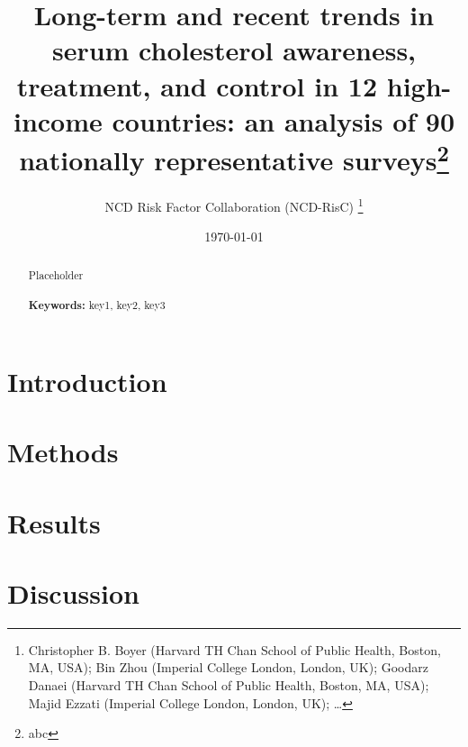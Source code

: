 \documentclass[12pt]{article}
\begin{document}
\begin{titlepage}
\title{Long-term and recent trends in serum cholesterol awareness, treatment, and control in 12 high-income countries: an analysis of 90 nationally representative surveys\thanks{abc}}
\author{NCD Risk Factor Collaboration (NCD-RisC) 
    \thanks{Christopher B. Boyer (Harvard TH Chan School of Public Health, Boston, MA, USA); Bin Zhou (Imperial College London, London, UK); Goodarz Danaei (Harvard TH Chan School of Public Health, Boston, MA, USA); Majid Ezzati (Imperial College London, London, UK); \ldots}}
\date{\today}
\maketitle
\begin{abstract}
\noindent Placeholder\\
\vspace{0in}\\
\noindent\textbf{Keywords:} key1, key2, key3\\

\bigskip
\end{abstract}
\setcounter{page}{0}
\thispagestyle{empty}
\end{titlepage}
\pagebreak \newpage

    


\doublespacing


\section{Introduction} \label{sec:introduction}

\section{Methods} \label{sec:methods}

\section{Results} \label{sec:result}

\section{Discussion} \label{sec:discussion}

\end{document}

